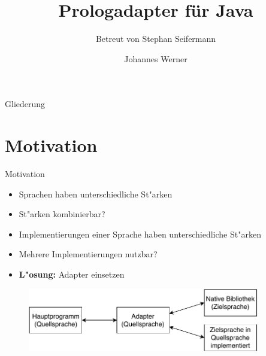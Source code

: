 \documentclass[18pt]{beamer}
\title[Prologadapter für Java]{Prologadapter für Java}
\subtitle{Betreut von Stephan Seifermann}
\author{Johannes Werner}
\institute{Fakultaet für Informatik}
\begin{document}

\begin{frame}
\titlepage
\end{frame}

\begin{frame}{Gliederung}
\tableofcontents
\end{frame}

\section{Motivation}
\begin{frame}{Motivation}
\begin{itemize}
\item Sprachen haben unterschiedliche St"arken
%
\item St"arken kombinierbar?
\vspace{0.2cm}
\item Implementierungen einer Sprache haben unterschiedliche St"arken
\item Mehrere Implementierungen nutzbar?
\vspace{0.2cm}
\item \textbf{L"osung:} Adapter einsetzen
\end{itemize}
\begin{figure}[h]
\centering
\includegraphics[width=0.9\textwidth]{adapter.pdf}
\end{figure}
\end{frame}
\end{document}
